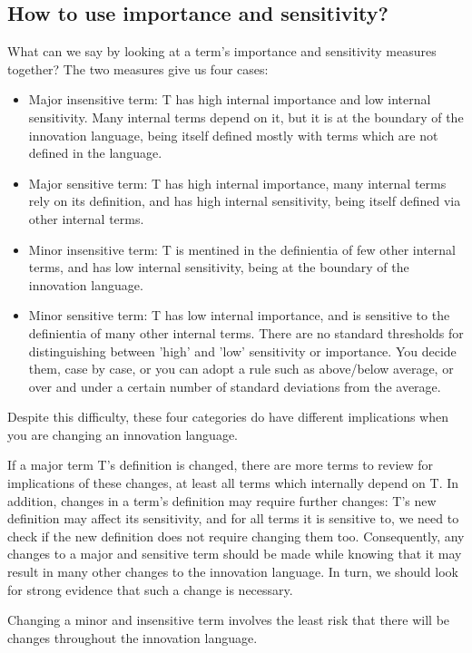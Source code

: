 \subsection{How to use importance and sensitivity?}
\label{c7:s3:ss7}
What can we say by looking at a term's importance and sensitivity measures together? The two measures give us four cases:

\begin{itemize}
	\item Major insensitive term: T has high internal importance and low internal sensitivity. Many internal terms depend on it, but it is at the boundary of the innovation language, being itself defined mostly with terms which are not defined in the language.
	\item Major sensitive term: T has high internal importance, many internal terms rely on its definition, and has high internal sensitivity, being itself defined via other internal terms.
	\item Minor insensitive term: T is mentined in the definientia of few other internal terms, and has low internal sensitivity, being at the boundary of the innovation language.
	\item Minor sensitive term: T has low internal importance, and is sensitive to the definientia of many other internal terms.
There are no standard thresholds for distinguishing between 'high' and 'low' sensitivity or importance. You decide them, case by case, or you can adopt a rule such as above/below average, or over and under a certain number of standard deviations from the average.
\end{itemize}

Despite this difficulty, these four categories do have different implications when you are changing an innovation language.

If a major term T's definition is changed, there are more terms to review for implications of these changes, at least all terms which internally depend on T. In addition, changes in a term's definition may require further changes: T's new definition may affect its sensitivity, and for all terms it is sensitive to, we need to check if the new definition does not require changing them too. Consequently, any changes to a major and sensitive term should be made while knowing that it may result in many other changes to the innovation language. In turn, we should look for strong evidence that such a change is necessary.

Changing a minor and insensitive term involves the least risk that there will be changes throughout the innovation language.

